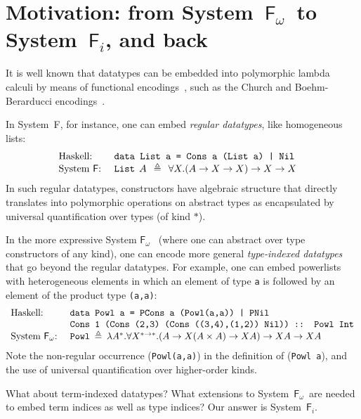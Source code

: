 \documentclass{llncs}
\newcommand{\Fi}{\ensuremath{\mathsf{F}_i}}
\newcommand{\Fw}{\ensuremath{\mathsf{F}_\omega}}
\begin{document}
\section{Motivation: from System~\Fw\ to System~\Fi, and back}
\label{sec:motiv}
It is well known that datatypes can be embedded into polymorphic lambda
calculi by means of functional encodings~\cite{AbeMatUus03}, such
as the Church and Boehm-Berarducci encodings~\cite{BoehmBerarducci}.

In System~\textsf{F}, for instance, one can embed \emph{regular
datatypes}, like homogeneous lists:
\[
\begin{array}{ll}
\text{Haskell:} & \texttt{data List a = Cons a (List a) | Nil} \\
\text{System \textsf{F}:}~& 
\texttt{{List}}\:\: A\:\:\triangleq\:\:
\forall X.
(A\to X\to X) \to X \to X ~~\; 
\end{array}
\]
In such regular datatypes, constructors have algebraic structure that
directly translates into polymorphic operations on abstract types as
encapsulated by universal quantification over types (of kind $*$).

In the more expressive System \Fw~ (where one can abstract over type constructors
of any kind),
one can encode more general \emph{type-indexed datatypes} that go beyond the 
regular datatypes. For example, one can embed powerlists with
heterogeneous elements in which an element of type \texttt{a} is followed by
an element of the product type \texttt{(a,a)}:
\[
\begin{array}{ll}
\text{Haskell:} & \texttt{data Powl a = 
        PCons a (Powl(a,a))
        | 
        PNil 
} \\
& \texttt{Cons 1 (Cons (2,3) (Cons ((3,4),(1,2)) Nil)) :: Powl Int}\\
\text{System \Fw:}~& \texttt{{Powl}}\:\triangleq\:
\lambda A^{*}.\forall X^{*\to*}. (A\to X(A\times A)\to X A) \to X A \to XA
\end{array}
\]
Note the non-regular occurrence (\texttt{Powl(a,a)}) in the definition of
(\texttt{Powl a}), and the use of universal quantification over
higher-order kinds.

What about term-indexed datatypes?  What extensions to System~\Fw\ are
needed to embed term indices as well as type indices?  Our answer is
System~\Fi.
\end{document}
